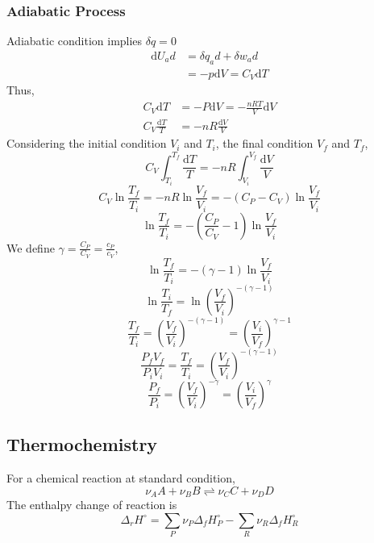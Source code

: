 \documentclass[letterpaper]{article}
\newcommand{\diff}{\mathrm{d}}
\begin{document}
\subsubsection*{Adiabatic Process}
Adiabatic condition implies $\delta q=0$
\begin{equation*}
    \begin{aligned}
        \diff U_ad&=\delta q_ad + \delta w_ad\\
        &=-p\diff V=C_V\diff T
    \end{aligned}
\end{equation*}
Thus,
\begin{equation*}
    \begin{aligned}
        C_V\diff T&=-P\diff V=-\frac{nRT}{V}\diff V\\
        C_V\frac{\diff T}{T}&=-nR\frac{\diff V}{V}
    \end{aligned}
\end{equation*}
Considering the initial condition $V_i$ and $T_i$, the final condition $V_f$ and $T_f$,
\begin{equation*}
    C_V\int_{T_i}^{T_f}\frac{\diff T}{T}=-nR\int_{V_i}^{V_f}\frac{\diff V}{V}
\end{equation*}
\begin{equation*}
    C_V\ln\frac{T_f}{T_i}=-nR\ln\frac{V_f}{V_i}=-(C_P-C_V)\ln\frac{V_f}{V_i}
\end{equation*}
\begin{equation*}
    \ln\frac{T_f}{T_i}=-(\frac{C_P}{C_V}-1)\ln\frac{V_f}{V_i}
\end{equation*}
We define $\gamma=\frac{C_P}{C_V}=\frac{c_P}{c_V}$,
\begin{equation*}
    \ln\frac{T_f}{T_i}=-(\gamma-1)\ln\frac{V_f}{V_i}
\end{equation*}
\begin{equation*}
    \ln\frac{T_i}{T_f}=\ln(\frac{V_f}{V_i})^{-(\gamma-1)}
\end{equation*}
\begin{equation*}
    \frac{T_f}{T_i}=(\frac{V_f}{V_i})^{-(\gamma-1)}=(\frac{V_i}{V_f})^{\gamma-1}
\end{equation*}
\begin{equation*}
    \frac{P_fV_f}{P_iV_i}=\frac{T_f}{T_i}=(\frac{V_f}{V_i})^{-(\gamma-1)}
\end{equation*}
\begin{equation*}
    \boxed{\frac{P_f}{P_i}=(\frac{V_f}{V_i})^{-\gamma}=(\frac{V_i}{V_f})^\gamma}
\end{equation*}
\subsection*{Thermochemistry}
For a chemical reaction at standard condition,
\begin{equation*}
    \nu_AA+\nu_BB\rightleftharpoons\nu_CC+\nu_DD
\end{equation*}
The enthalpy change of reaction is
\begin{equation*}
    \Delta_rH^\circ=\sum_P\nu_P\Delta_fH^\circ_P-\sum_R\nu_R\Delta_fH^\circ_R
\end{equation*}
\end{document}
